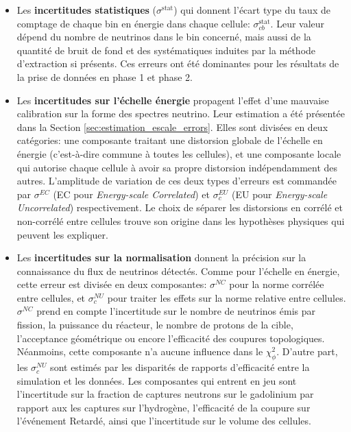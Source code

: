 \begin{itemize}[label=\textbullet]
    \item Les \textbf{incertitudes statistiques} ($\sigma^\textrm{stat}$) qui donnent l'écart type du taux de comptage de chaque bin en énergie dans chaque cellule: $\sigma^\textrm{stat}_{cb}$. Leur valeur dépend du nombre de neutrinos dans le bin concerné, mais aussi de la quantité de bruit de fond et des systématiques induites par la méthode d'extraction si présents. Ces erreurs ont été dominantes pour les résultats de la prise de données en phase 1 et phase 2.\\
    \item Les \textbf{incertitudes sur l'échelle énergie} propagent l'effet d'une mauvaise calibration sur la forme des spectres neutrino. Leur estimation a été présentée dans la Section \ref{sec:estimation_escale_errors}. Elles sont divisées en deux catégories: une composante traitant une distorsion globale de l'échelle en énergie (c'est-à-dire commune à toutes les cellules), et une composante locale qui autorise chaque cellule à avoir sa propre distorsion indépendamment des autres. L'amplitude de variation de ces deux types d'erreurs est commandée par $\sigma^{EC}$ (EC pour \textit{Energy-scale Correlated}) et $\sigma^{EU}_c$ (EU pour \textit{Energy-scale Uncorrelated}) respectivement. Le choix de séparer les distorsions en corrélé et non-corrélé entre cellules trouve son origine dans les hypothèses physiques qui peuvent les expliquer.\\
    \item Les \textbf{incertitudes sur la normalisation} donnent la précision sur la connaissance du flux de neutrinos détectés. Comme pour l'échelle en énergie, cette erreur est divisée en deux composantes: $\sigma^{NC}$ pour la norme corrélée entre cellules, et $\sigma^{NU}_c$ pour traiter les effets sur la norme relative entre cellules. $\sigma^{NC}$ prend en compte l'incertitude sur le nombre de neutrinos émis par fission, la puissance du réacteur, le nombre de protons de la cible, l'acceptance géométrique ou encore l'efficacité des coupures topologiques. Néanmoins, cette composante n'a aucune influence dans le $\chi^2_\phi$. D'autre part, les $\sigma^{NU}_c$ sont estimés par les disparités de rapports d'efficacité entre la simulation et les données. Les composantes qui entrent en jeu sont l'incertitude sur la fraction de captures neutrons sur le gadolinium par rapport aux les captures sur l'hydrogène, l'efficacité de la coupure sur l'événement Retardé, ainsi que l'incertitude sur le volume des cellules.\\

\end{itemize}
